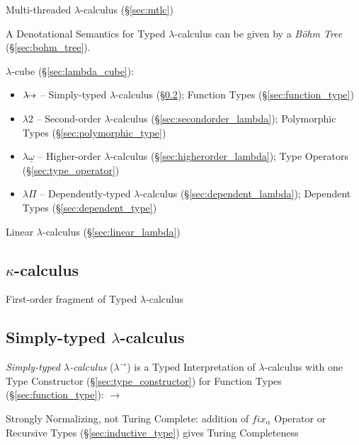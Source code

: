 \fist Multi-threaded $\lambda$-calculus (\S\ref{sec:mtlc})

A Denotational Semantics for Typed $\lambda$-calculus can be given by a
\emph{B\"ohm Tree} (\S\ref{sec:bohm_tree}).

$\lambda$-cube (\S\ref{sec:lambda_cube}):
\begin{itemize}
  \item $\lambda\kern-5pt\rightarrow$ -- Simply-typed
    $\lambda$-calculus (\S\ref{sec:simply_typed}); Function Types
    (\S\ref{sec:function_type})
  \item $\lambda2$ -- Second-order $\lambda$-calculus
    (\S\ref{sec:secondorder_lambda}); Polymorphic Types
    (\S\ref{sec:polymorphic_type})
  \item $\lambda\underline{\omega}$ -- Higher-order $\lambda$-calculus
    (\S\ref{sec:higherorder_lambda}); Type Operators
    (\S\ref{sec:type_operator})
  \item $\lambda\Pi$ -- Dependently-typed $\lambda$-calculus
    (\S\ref{sec:dependent_lambda}); Dependent Types
    (\S\ref{sec:dependent_type})
\end{itemize}

Linear $\lambda$-calculus (\S\ref{sec:linear_lambda})



\subsection{$\kappa$-calculus}\label{sec:kappa_calculus}

First-order fragment of Typed $\lambda$-calculus



\subsection{Simply-typed $\lambda$-calculus}\label{sec:simply_typed}

\emph{Simply-typed $\lambda$-calculus} ($\lambda^\rightarrow$) is a
Typed Interpretation of $\lambda$-calculus with one Type Constructor
(\S\ref{sec:type_constructor}) for Function Types
(\S\ref{sec:function_type}): $\rightarrow$

Strongly Normalizing, not Turing Complete: addition of $fix_\alpha$
Operator or Recursive Types (\S\ref{sec:inductive_type}) gives
Turing Completeness

